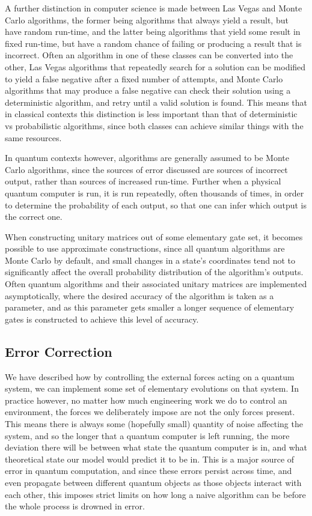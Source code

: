 A further distinction in computer science is made between Las Vegas and Monte Carlo algorithms, the former being algorithms that always yield a result, but have random run-time, and the latter being algorithms that yield some result in fixed run-time, but have a random chance of failing or producing a result that is incorrect. Often an algorithm in one of these classes can be converted into the other, Las Vegas algorithms that repeatedly search for a solution can be modified to yield a false negative after a fixed number of attempts, and Monte Carlo algorithms that may produce a false negative can check their solution using a deterministic algorithm, and retry until a valid solution is found. This means that in classical contexts this distinction is less important than that of deterministic vs probabilistic algorithms, since both classes can achieve similar things with the same resources.

In quantum contexts however, algorithms are generally assumed to be Monte Carlo algorithms, since the sources of error discussed are sources of incorrect output, rather than sources of increased run-time. Further when a physical quantum computer is run, it is run repeatedly, often thousands of times, in order to determine the probability of each output, so that one can infer which output is the correct one.

When constructing unitary matrices out of some elementary gate set, it becomes possible to use approximate constructions, since all quantum algorithms are Monte Carlo by default, and small changes in a state's coordinates tend not to significantly affect the overall probability distribution of the algorithm's outputs. Often quantum algorithms and their associated unitary matrices are implemented asymptotically, where the desired accuracy of the algorithm is taken as a parameter, and as this parameter gets smaller a longer sequence of elementary gates is constructed to achieve this level of accuracy.

\subsection{Error Correction}\label{error-codes}
We have described how by controlling the external forces acting on a quantum system, we can implement some set of elementary evolutions on that system. In practice however, no matter how much engineering work we do to control an environment, the forces we deliberately impose are not the only forces present. This means there is always some (hopefully small) quantity of noise affecting the system, and so the longer that a quantum computer is left running, the more deviation there will be between what state the quantum computer is in, and what theoretical state our model would predict it to be in. This is a major source of error in quantum computation, and since these errors persist across time, and even propagate between different quantum objects as those objects interact with each other, this imposes strict limits on how long a naive algorithm can be before the whole process is drowned in error.

